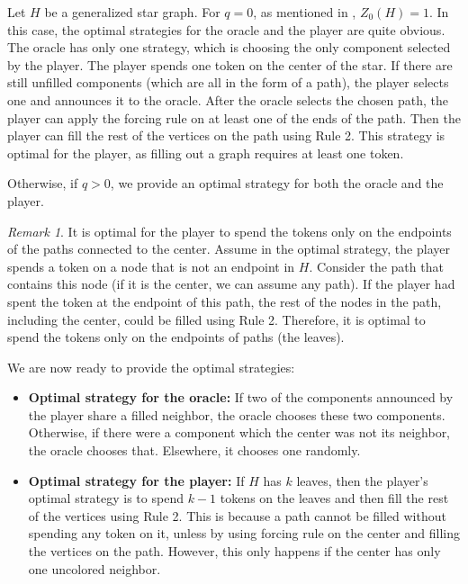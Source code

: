 \documentclass[11pt]{article}
\theoremstyle{plain}
\theoremstyle{definition}
\theoremstyle{remark}
\newtheorem*{remark}{Remark}
\begin{document}
  

Let $H$ be a generalized star graph. For $q = 0$, as mentioned in \cite[Theorem 4]{butler2020properties}, $Z_0(H) = 1$. In this case, the optimal strategies for the oracle and the player are quite obvious. The oracle has only one strategy, which is choosing the only component selected by the player. The player spends one token on the center of the star. If there are still unfilled components (which are all in the form of a path), the player selects one and announces it to the oracle. After the oracle selects the chosen path, the player can apply the forcing rule on at least one of the ends of the path. Then the player can fill the rest of the vertices on the path using Rule 2. This strategy is optimal for the player, as filling out a graph requires at least one token.

 

Otherwise, if $q > 0$, we provide an optimal strategy for both the oracle and the player.

\begin{remark} 
It is optimal for the player to spend the tokens only on the endpoints of the paths connected to the center. Assume in the optimal strategy, the player spends a token on a node that is not an endpoint in $H$. Consider the path that contains this node (if it is the center, we can assume any path). If the player had spent the token at the endpoint of this path, the rest of the nodes in the path, including the center, could be filled using Rule 2. Therefore, it is optimal to spend the tokens only on the endpoints of paths (the leaves).
\end{remark}

We are now ready to provide the optimal strategies:

\begin{itemize}
\item \textbf{Optimal strategy for the oracle:} If two of the components announced by the player share a filled neighbor, the oracle chooses these two components. Otherwise, if there were a component which the center was not its neighbor, the oracle chooses that. Elsewhere, it chooses one randomly.
\item \textbf{Optimal strategy for the player:} If $H$ has $k$ leaves, then the player’s optimal strategy is to spend $k-1$ tokens on the leaves and then fill the rest of the vertices using Rule 2. This is because a path cannot be filled without spending any token on it, unless by using forcing rule on the center and filling the vertices on the path. However, this only happens if the center has only one uncolored neighbor.
\end{itemize}
\end{document}
